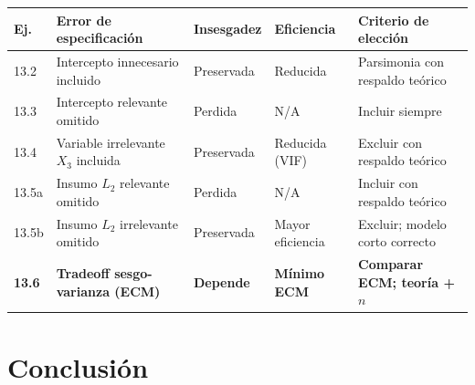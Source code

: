\documentclass[12pt, letterpaper]{article}
\begin{document}
\begin{center}
\renewcommand{\arraystretch}{1.4}
\small
\begin{tabular}{p{1.0cm}p{4.0cm}p{2.2cm}p{2.4cm}p{3.0cm}}
\toprule
\textbf{Ej.} & \textbf{Error de especificación} & \textbf{Insesgadez} &
\textbf{Eficiencia} & \textbf{Criterio de elección} \\
\midrule
13.2 & Intercepto innecesario incluido     & Preservada  & Reducida           & Parsimonia con respaldo teórico \\
13.3 & Intercepto relevante omitido        & Perdida     & N/A                & Incluir siempre \\
13.4 & Variable irrelevante $X_3$ incluida & Preservada  & Reducida (VIF)     & Excluir con respaldo teórico \\
13.5a & Insumo $L_2$ relevante omitido    & Perdida     & N/A                & Incluir con respaldo teórico \\
13.5b & Insumo $L_2$ irrelevante omitido  & Preservada  & Mayor eficiencia   & Excluir; modelo corto correcto \\
\textbf{13.6} & \textbf{Tradeoff sesgo-varianza (ECM)} & \textbf{Depende} &
  \textbf{Mínimo ECM} & \textbf{Comparar ECM; teoría + $n$} \\
\bottomrule
\end{tabular}
\end{center}

\section{Conclusión}
\end{document}
